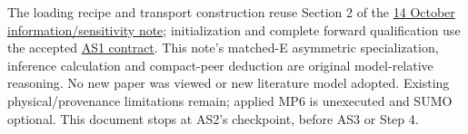 \documentclass[11pt,a4paper]{article}
\begin{document}
The loading recipe and transport construction reuse Section 2 of the
\href{vsl_step3_information_and_sensitivity.pdf}{14 October information/sensitivity note};
initialization and complete forward qualification use the accepted
\href{vsl_as1_asymmetric_forward_contract.pdf}{AS1 contract}.
This note's matched-E asymmetric specialization, inference calculation and
compact-peer deduction are original model-relative reasoning. No new paper
was viewed or new literature model adopted. Existing physical/provenance
limitations remain; applied MP6 is unexecuted and SUMO optional. This
document stops at AS2's checkpoint, before AS3 or Step 4.
\end{document}
